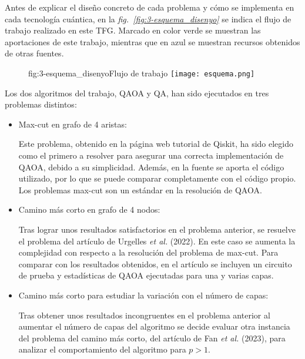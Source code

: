 Antes de explicar el diseño concreto de cada problema y cómo se implementa en cada tecnología cuántica, en la \textit{fig.~\ref{fig:3-esquema_disenyo}} se indica el flujo de trabajo realizado en este TFG\@.
Marcado en color verde se muestran las aportaciones de este trabajo, mientras que en azul se muestran recursos obtenidos de otras fuentes.

\begin{figure}[Flujo de trabajo]{fig:3-esquema_disenyo}{Flujo de trabajo}
  \centering
  \texttt{[image: esquema.png]}
\end{figure}

Los dos algoritmos del trabajo, QAOA y QA, han sido ejecutados en tres problemas distintos:

\begin{itemize}
\item Max-cut en grafo de 4 aristas:

  Este problema, obtenido en la página web tutorial de Qiskit\cite{qiskit_tutorial_antiguo}, ha sido elegido como el primero a resolver para asegurar una correcta implementación de QAOA, debido a su simplicidad.
  Además, en la fuente se aporta el código utilizado, por lo que se puede comparar completamente con el código propio.
  Los problemas max-cut son un estándar en la resolución de QAOA.

\item Camino más corto en grafo de 4 nodos:

  Tras lograr unos resultados satisfactorios en el problema anterior, se resuelve el problema del artículo de Urgelles \textit{et al.} (2022)\cite{multi-objective_routing_optimization}.
  En este caso se aumenta la complejidad con respecto a la resolución del problema de max-cut.
  Para comparar con los resultados obtenidos, en el artículo se incluyen un circuito de prueba y estadísticas de QAOA ejecutadas para una y varias capas.

\item Camino más corto para estudiar la variación con el número de capas:

  Tras obtener unos resultados incongruentes en el problema anterior al aumentar el número de capas del algoritmo se decide evaluar otra instancia del problema del camino más corto, del artículo de Fan \textit{et al.} (2023)\cite{solving_shortest_path_with_qaoa}, para analizar el comportamiento del algoritmo para $p > 1$.
\end{itemize}

